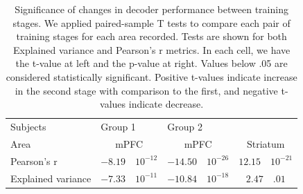     
    
    \begin{table}[ht]
        \centering
        \begin{tabular}{l|c|c|c}
            \hline
            Subjects & \multicolumn{1}{l}{Group 1} & \multicolumn{2}{l}{Group 2}\\
            Area & mPFC & mPFC & Striatum \\
            \hline
            Pearson's r         & $-8.19 \quad 10^{-12}$ 
                                & $-14.50 \quad 10^{-26}$ 
                                & $12.15 \quad 10^{-21}$ \\
            Explained variance  & $-7.33 \quad 10^{-11}$ 
                                & $-10.84 \quad 10^{-18}$ 
                                & $2.47 \quad .01$\\
            \hline
        \end{tabular}
        \caption[Significance of changes in decoder performance between training stages]{Significance of changes in decoder performance between training stages. We applied paired-sample T tests to compare each pair of training stages for each area recorded. Tests are shown for both Explained variance and Pearson's r metrics. In each cell, we have the t-value at left and the p-value at right. Values below .05 are considered statistically significant. Positive t-values indicate increase in the second stage with comparison to the first, and negative t-values indicate decrease.}
        \label{tab:statistics_learning_stage}
    \end{table}


